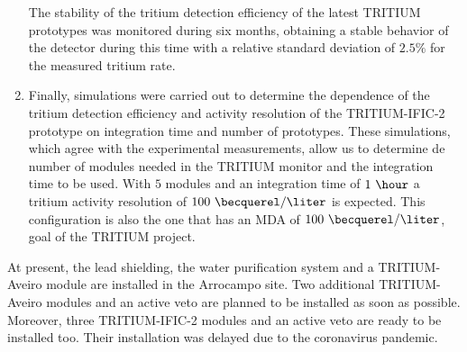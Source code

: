 \begin{enumerate}
The stability of the tritium detection efficiency of the latest TRITIUM prototypes was monitored during six months, obtaining a stable behavior of the detector during this time with a relative standard deviation of $2.5\%$ for the measured tritium rate. 

\item{} Finally, simulations were carried out to determine the dependence of the tritium detection efficiency and activity resolution of the TRITIUM-IFIC-2 prototype on integration time and number of prototypes. These simulations, which agree with the experimental measurements, allow us to determine de number of modules needed in the TRITIUM monitor and the integration time to be used. With $5$ modules and an integration time of $1~\hour$ a tritium activity resolution of $100~\becquerel/\liter$ is expected. This configuration is also the one that has an MDA of $100~\becquerel/\liter$, goal of the TRITIUM project.


\end{enumerate}

At present, the lead shielding, the water purification system and a TRITIUM-Aveiro module are installed in the Arrocampo site. Two additional TRITIUM-Aveiro modules and an active veto are planned to be installed as soon as possible. Moreover, three TRITIUM-IFIC-2 modules and an active veto are ready to be installed too. Their installation was delayed due to the coronavirus pandemic.
